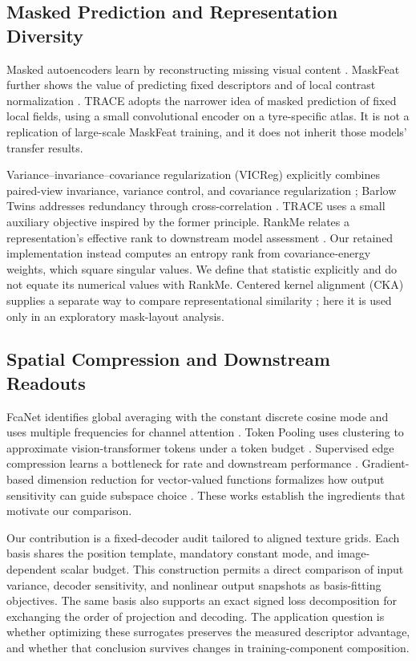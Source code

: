 \subsection{Masked Prediction and Representation Diversity}
Masked autoencoders learn by reconstructing missing visual content \cite{mae}. MaskFeat further shows the value of predicting fixed descriptors and of local contrast normalization \cite{maskfeat}. TRACE adopts the narrower idea of masked prediction of fixed local fields, using a small convolutional encoder on a tyre-specific atlas. It is not a replication of large-scale MaskFeat training, and it does not inherit those models' transfer results.

Variance--invariance--covariance regularization (VICReg) explicitly combines paired-view invariance, variance control, and covariance regularization \cite{vicreg}; Barlow Twins addresses redundancy through cross-correlation \cite{barlow}. TRACE uses a small auxiliary objective inspired by the former principle. RankMe relates a representation's effective rank to downstream model assessment \cite{rankme}. Our retained implementation instead computes an entropy rank from covariance-energy weights, which square singular values. We define that statistic explicitly and do not equate its numerical values with RankMe. Centered kernel alignment (CKA) supplies a separate way to compare representational similarity \cite{cka}; here it is used only in an exploratory mask-layout analysis.

\subsection{Spatial Compression and Downstream Readouts}
FcaNet identifies global averaging with the constant discrete cosine mode and uses multiple frequencies for channel attention \cite{fcanet}. Token Pooling uses clustering to approximate vision-transformer tokens under a token budget \cite{tokenpool}. Supervised edge compression learns a bottleneck for rate and downstream performance \cite{matsubara}. Gradient-based dimension reduction for vector-valued functions formalizes how output sensitivity can guide subspace choice \cite{zahm}. These works establish the ingredients that motivate our comparison.

Our contribution is a fixed-decoder audit tailored to aligned texture grids. Each basis shares the position template, mandatory constant mode, and image-dependent scalar budget. This construction permits a direct comparison of input variance, decoder sensitivity, and nonlinear output snapshots as basis-fitting objectives. The same basis also supports an exact signed loss decomposition for exchanging the order of projection and decoding. The application question is whether optimizing these surrogates preserves the measured descriptor advantage, and whether that conclusion survives changes in training-component composition.
